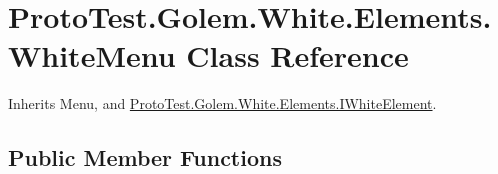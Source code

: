 \hypertarget{class_proto_test_1_1_golem_1_1_white_1_1_elements_1_1_white_menu}{\section{Proto\-Test.\-Golem.\-White.\-Elements.\-White\-Menu Class Reference}
\label{class_proto_test_1_1_golem_1_1_white_1_1_elements_1_1_white_menu}
}


Inherits Menu, and \hyperlink{interface_proto_test_1_1_golem_1_1_white_1_1_elements_1_1_i_white_element}{Proto\-Test.\-Golem.\-White.\-Elements.\-I\-White\-Element}.

\subsection*{Public Member Functions}
